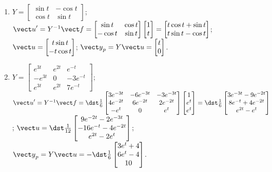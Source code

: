 \documentclass[openany]{book}
\newenvironment{sectionSolutions}{
 \begin{enumerate}[item-label={\thesection.\arabic{enumi}.}]
}{
 \end{enumerate}
}
\begin{document}
\begin{sectionSolutions}
\item
$Y=\begin{bmatrix}\sin t&-\cos t\\
\cos t&\sin t\end{bmatrix}$;
${\vect u}'=Y^{-1}{\vect f}=
\begin{bmatrix}\sin t&\cos t\\-\cos t&\sin t\end{bmatrix}
\begin{bmatrix}1\\t\end{bmatrix}=
\begin{bmatrix}t\cos t+\sin t\\t\sin t-\cos
t\end{bmatrix}$;
${\vect u}=
\begin{bmatrix}t\sin t\\-t\cos t\end{bmatrix}$;
${\vect y}_p=Y{\vect u}=
\begin{bmatrix}t\\0\end{bmatrix}$.


\item
$Y=\begin{bmatrix}
e^{3t}&e^{2t}&e^{-t}\\-e^{3t}&0&-3e^{-t}\\e^{3t}&e^{2t}&7
e^{-t}\end{bmatrix}$;
${\vect u}'=Y^{-1}{\vect f}=
\dst\frac{1}{6}\begin{bmatrix}
3e^{-3t}&-6e^{-3t}&-3e^{-3t}\\4e^{-2t}&6e^{-2t}&2e^{-2t}\\
-e^t&0&e^t\end{bmatrix}
\begin{bmatrix}1\\e^t\\e^t\end{bmatrix}=
\dst\frac{1}{6}\begin{bmatrix}
3e^{-3t}-9e^{-2t}\\8e^{-t}+4e^{-2t}\\e^{2t}-e^t\end{bmatrix}$;
${\vect u}=
\dst\frac{1}{12}\begin{bmatrix}9e^{-2t}-2e^{-3t}\\
-16e^{-t}-4e^{-2t}\\e^{2t}-2e^t\end{bmatrix}$;
${\vect y}_p=Y{\vect u}=
-\dst\frac{1}{6}\begin{bmatrix}3e^t+4\\6e^t-4\\10
\end{bmatrix}$.



\end{sectionSolutions}
\end{document}

